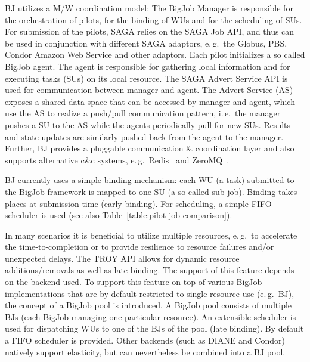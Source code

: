 \documentclass[conference,final]{IEEEtran}
\newcommand{\upp}{\vspace*{-0.5em}}
\begin{document}
BJ utilizes a M/W coordination model: The BigJob Manager is responsible for the
orchestration of pilots, for the binding of WUs and for the scheduling of SUs.
For submission of the pilots, SAGA relies on the SAGA Job API, and thus can be
used in conjunction with different SAGA adaptors, e.\,g.\ the Globus, PBS,
Condor Amazon Web Service and other adaptors. Each pilot initializes a so called
BigJob agent. The agent is responsible for gathering local information and for
executing tasks (SUs) on its local resource. The SAGA Advert Service API is used
for communication between manager and agent. The Advert Service (AS) exposes a
shared data space that can be accessed by manager and agent, which use the AS to
realize a push/pull communication pattern, i.\,e.\ the manager pushes a SU to
the AS while the agents periodically pull for new SUs. Results and state updates
are similarly pushed back from the agent to the manager. Further, BJ provides a
pluggable communication \& coordination layer and also supports alternative c\&c
systems, e.\,g.\ Redis~\cite{redis} and ZeroMQ~\cite{zmq}.

BJ currently uses a simple binding mechanism: each WU (a task)
submitted to the BigJob framework is mapped to one SU (a so called
sub-job).  Binding takes places at submission time (early binding).
For scheduling, a simple FIFO scheduler is used (see also
Table~\ref{table:pilot-job-comparison}).




In many scenarios it is beneficial to utilize multiple resources, e.\,g.\ to
accelerate the time-to-completion or to provide resilience to resource failures
and/or unexpected delays. The TROY API allows for dynamic resource
additions/removals as well as late binding. The support of this feature depends
on the backend used. To support this feature on top of various BigJob
implementations that are by default restricted to single resource use (e.\,g.\
BJ), the concept of a BigJob pool is introduced. A BigJob pool consists of
multiple BJs (each BigJob managing one particular resource). An extensible
scheduler is used for dispatching WUs to one of the BJs of the pool (late
binding). By default a FIFO scheduler is provided. Other backends (such as DIANE
and Condor) natively support elasticity, but can nevertheless be combined into a
BJ pool.

% 
\upp
\end{document}
